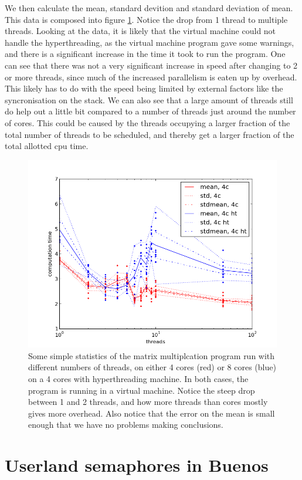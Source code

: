 \documentclass{article}
\begin{document}
We then calculate the mean, standard devition and standard deviation of mean. This data is composed into figure \ref{fig:stat}. Notice the drop from 1 thread to multiple threads. Looking at the data, it is likely that the virtual machine could not handle the hyperthreading, as the virtual machine program gave some warnings, and there is a significant increase in the time it took to run the program. One can see that there was not a very significant increase in speed after changing to 2 or more threads, since much of the increased parallelism is eaten up by overhead. This likely has to do with the speed being limited by external factors like the syncronisation on the stack. We can also see that a large amount of threads still do help out a little bit compared to a number of threads just around the number of cores. This could be caused by the threads occupying a larger fraction of the total number of threads to be scheduled, and thereby get a larger fraction of the total allotted cpu time.

\begin{figure}
\includegraphics[width=12cm]{stack/figure_1.png}
\caption{Some simple statistics of the matrix multiplcation program run with different numbers of threads, on either 4 cores (red) or 8 cores (blue) on a 4 cores with hyperthreading machine. In both cases, the program is running in a virtual machine. Notice the steep drop between 1 and 2 threads, and how more threads than cores mostly gives more overhead. Also notice that the error on the mean is small enough that we have no problems making conclusions.} 
\label{fig:stat}
\end{figure}

\section{Userland semaphores in Buenos}
\end{document}
